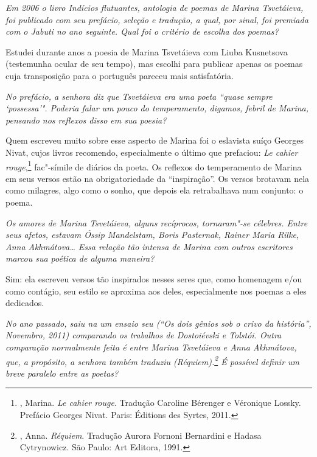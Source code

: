 \emph{Em 2006 o livro \emph{Indícios flutuantes}, antologia de poemas de
Marina Tsvetáieva, foi publicado com seu prefácio, seleção e tradução, a
qual, por sinal, foi premiada com o Jabuti no ano seguinte. Qual foi o
critério de escolha dos poemas?}

Estudei durante anos a poesia de Marina Tsvetáieva com Liuba Kusnetsova
(testemunha ocular de seu tempo), mas escolhi para publicar apenas os
poemas cuja transposição para o português pareceu mais satisfatória.

\medskip

\emph{No prefácio, a senhora diz que Tsvetáieva era uma poeta ``quase
sempre `possessa'". Poderia falar um pouco do temperamento, digamos,
febril de Marina, pensando nos reflexos disso em sua poesia?}

Quem escreveu muito sobre esse aspecto de Marina foi o eslavista suíço
Georges Nivat, cujos livros recomendo, especialmente o último que
prefaciou: \emph{Le cahier rouge},\footnote{, Marina. \emph{Le
  cahier rouge}. Tradução Caroline Bérenger e Véronique Lossky. Prefácio
  Georges Nivat. Paris: Éditions des Syrtes, 2011.} fac"-símile de
diários da poeta. Os reflexos do temperamento de Marina em seus versos
estão na obrigatoriedade da ``inspiração''. Os versos brotavam nela como
milagres, algo como o sonho, que depois ela retrabalhava num conjunto: o
poema.

\medskip

\emph{Os amores de Marina Tsvetáieva, alguns recíprocos, tornaram"-se
célebres. Entre seus afetos, estavam Óssip Mandelstam, Boris Pasternak,
Rainer Maria Rilke, Anna Akhmátova\ldots{} Essa relação tão intensa de Marina
com outros escritores marcou sua poética de alguma maneira?}

Sim: ela escreveu versos tão inspirados nesses seres que, como homenagem
e/ou como contágio, seu estilo se aproxima aos deles, especialmente nos
poemas a eles dedicados.

\medskip

\emph{No ano passado, saiu na  um ensaio seu (``Os dois
gênios sob o crivo da história'', Novembro, 2011) comparando os
trabalhos de Dostoiévski e Tolstói. Outra comparação normalmente feita é
entre Marina Tsvetáieva e Anna Akhmátova, que, a propósito, a senhora
também traduziu (\emph{Réquiem}).\footnote{, Anna.
  \emph{Réquiem}. Tradução Aurora Fornoni Bernardini e Hadasa
  Cytrynowicz. São Paulo: Art Editora, 1991.} É possível definir
um breve paralelo entre as poetas?}

